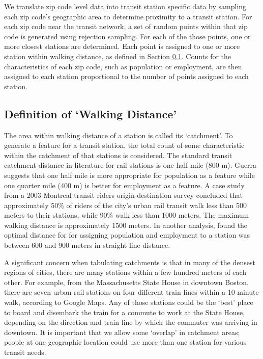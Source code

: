 \documentclass[11pt]{article}
\begin{document}
We translate zip code level data into transit station specific data by sampling each zip code's geographic area to determine proximity to a transit station. For each zip code near the transit network, a set of random points within that zip code is generated using rejection sampling. For each of the those points, one or more closest stations are determined. Each point is assigned to one or more station within walking distance, as defined in Section \ref{sec:walk}. Counts for the characteristics of each zip code, such as population or employment, are then assigned to each station proportional to the number of points assigned to each station.

\subsection{Definition of `Walking Distance'}\label{sec:walk}

The area within walking distance of a station is called its `catchment'. To generate a feature for a transit station, the total count of some characteristic within the catchment of that stations is considered. The standard transit catchment distance in literature for rail stations is one half mile (800 m). Guerra \cite{Guerra2012} suggests that one half mile is more appropriate for population as a feature while one quarter mile (400 m) is better for employment as a feature. A case study \cite{ElGeneidy2014} from a 2003 Montreal transit riders origin-destination survey concluded that approximately 50\% of riders of the city's urban rail transit walk less than 500 meters to their stations, while 90\% walk less than 1000 meters. The maximum walking distance is approximately 1500 meters. In another analysis, \cite{Gutierrez2011} found the optimal distance for  for assigning population and employment to a station was between 600 and 900 meters in straight line distance.

A significant concern when tabulating catchments is that in many of the densest regions of cities, there are many stations within a few hundred meters of each other. For example, from the Massachusetts State House in downtown Boston, there are seven urban rail stations on four different train lines within a 10 minute walk, according to Google Maps. Any of those stations could be the `best' place to board and disembark the train for a commute to work at the State House, depending on the direction and train line by which the commuter was arriving in downtown. It is important that we allow some `overlap' in catchment areas; people at one geographic location could use more than one station for various transit needs. 
\end{document}
